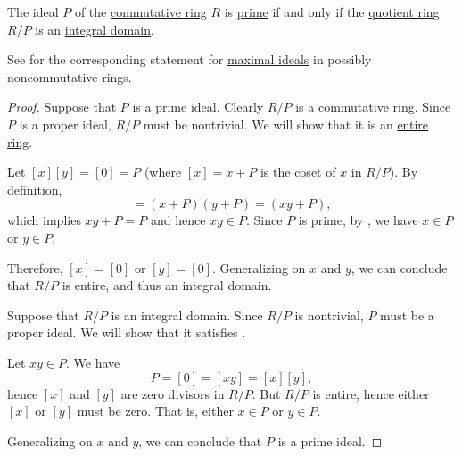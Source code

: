 \begin{proposition}\label{thm:quotient_by_prime_ideal}
  The ideal \( P \) of the \hyperref[def:ring/commutative]{commutative ring} \( R \) is \hyperref[def:semiring_ideal/prime]{prime} if and only if the \hyperref[def:ring/quotient]{quotient ring} \( R / P \) is an \hyperref[def:integral_domain]{integral domain}.

  See  for the corresponding statement for \hyperref[def:semiring_ideal/maximal]{maximal ideals} in possibly noncommutative rings.
\end{proposition}
\begin{proof}
  \SufficiencySubProof Suppose that \( P \) is a prime ideal. Clearly \( R / P \) is a commutative ring. Since \( P \) is a proper ideal, \( R / P \) must be nontrivial. We will show that it is an \hyperref[def:entire_semiring]{entire ring}.

  Let \( [x] [y] = [0] = P \) (where \( [x] = x + P \) is the coset of \( x \) in \( R / P \)). By definition,
  \begin{equation*}
    [x] [y] = (x + P) (y + P) = (xy + P),
  \end{equation*}
  which implies \( xy + P = P \) and hence \( xy \in P \). Since \( P \) is prime, by , we have \( x \in P \) or \( y \in P \).

  Therefore, \( [x] = [0] \) or \( [y] = [0] \). Generalizing on \( x \) and \( y \), we can conclude that \( R / P \) is entire, and thus an integral domain.

  \NecessitySubProof Suppose that \( R / P \) is an integral domain. Since \( R / P \) is nontrivial, \( P \) must be a proper ideal. We will show that it satisfies .

  Let \( xy \in P \). We have
  \begin{equation*}
    P = [0] = [xy] = [x] [y],
  \end{equation*}
  hence \( [x] \) and \( [y] \) are zero divisors in \( R / P \). But \( R / P \) is entire, hence either \( [x] \) or \( [y] \) must be zero. That is, either \( x \in P \) or \( y \in P \).

  Generalizing on \( x \) and \( y \), we can conclude that \( P \) is a prime ideal.
\end{proof}


